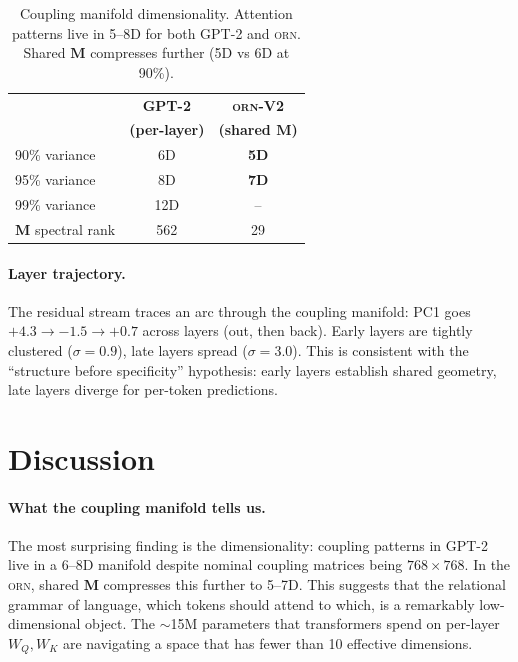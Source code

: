 \documentclass[10pt,twocolumn]{article}
\newcommand{\M}{\mathbf{M}}
\newcommand{\orn}{\textsc{orn}}
\begin{document}
\begin{table}[h]
\centering\footnotesize
\begin{tabular}{@{}lcc@{}}
\toprule
& \textbf{GPT-2} & \textbf{\orn{}-V2} \\
& \textbf{(per-layer)} & \textbf{(shared $\M$)} \\
\midrule
90\% variance & 6D & \textbf{5D} \\
95\% variance & 8D & \textbf{7D} \\
99\% variance & 12D & --  \\
\midrule
$\M$ spectral rank & 562 & 29 \\
\bottomrule
\end{tabular}
\caption{Coupling manifold dimensionality. Attention patterns live in 5--8D for both GPT-2 and \orn{}. Shared $\M$ compresses further (5D vs 6D at 90\%).}
\label{tab:manifold}
\end{table}

\paragraph{Layer trajectory.}
The residual stream traces an arc through the coupling manifold: PC1 goes $+4.3 \to -1.5 \to +0.7$ across layers (out, then back).
Early layers are tightly clustered ($\sigma=0.9$), late layers spread ($\sigma=3.0$).
This is consistent with the ``structure before specificity'' hypothesis: early layers establish shared geometry, late layers diverge for per-token predictions.


\section{Discussion}
\label{sec:discussion}

\paragraph{What the coupling manifold tells us.}
The most surprising finding is the dimensionality: coupling patterns in GPT-2 live in a 6--8D manifold despite nominal coupling matrices being $768 \times 768$.
In the \orn{}, shared $\M$ compresses this further to 5--7D.
This suggests that the relational grammar of language, which tokens should attend to which, is a remarkably low-dimensional object.
The $\sim$15M parameters that transformers spend on per-layer $W_Q, W_K$ are navigating a space that has fewer than 10 effective dimensions.
\end{document}
